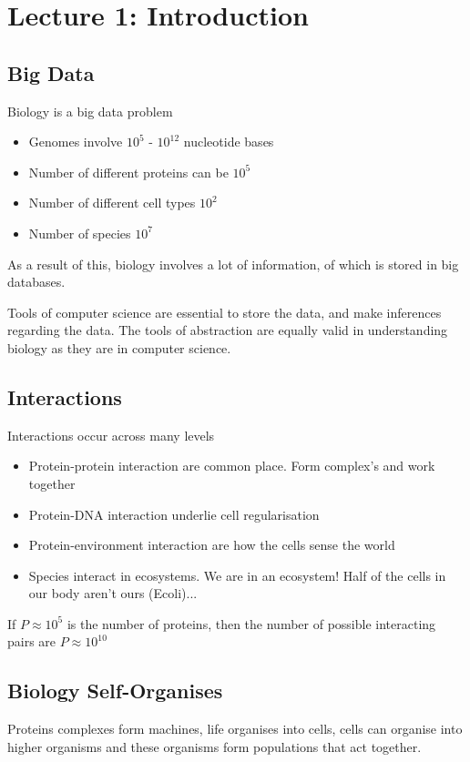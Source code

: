 \section{Lecture 1: Introduction}

\subsection{Big Data}
Biology is a big data problem
\begin{itemize}
    \itemsep0em
    \item Genomes involve $10^5$ - $10^{12}$ nucleotide bases
    \item Number of different proteins can be $10^5$
    \item Number of different cell types $10^2$
    \item Number of species $10^7$
\end{itemize}

As a result of this, biology involves a lot of information, of which is stored in big databases.

\par\noindent Tools of computer science are essential to store the data, and make inferences regarding the data. The tools of abstraction are equally valid in understanding biology as they are in computer science.

\subsection{Interactions}

Interactions occur across many levels
\begin{itemize}
    \itemsep0em
    \item Protein-protein interaction are common place. Form complex's and work together
    \item Protein-DNA interaction underlie cell regularisation
    \item Protein-environment interaction are how the cells sense the world
    \item Species interact in ecosystems. We are in an ecosystem! Half of the cells in our body aren't ours (Ecoli)...
\end{itemize}

If $P\approx 10^5$ is the number of proteins, then the number of possible interacting pairs are $P\approx 10^{10}$

\subsection{Biology Self-Organises}
Proteins complexes form machines, life organises into cells, cells can organise into higher organisms and these organisms form populations that act together.

